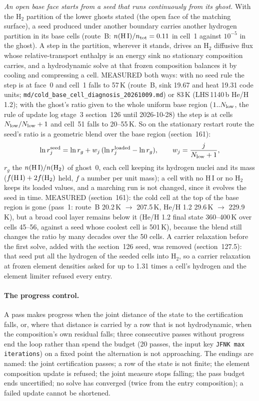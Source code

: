 \emph{An open base face starts from a seed that runs continuously from its
ghost.}  With the H$_2$ partition of the lower ghosts stated (the open face of
the matching surface), a seed produced under another boundary carries another
hydrogen partition in its base cells (route~B: $n({\rm H\,I})/n_{\rm tot} =
0.11$ in cell~1 against $10^{-5}$ in the ghost).  A step in the partition,
wherever it stands, drives an H$_2$ diffusive flux whose relative-transport
enthalpy is an energy sink no stationary composition carries, and a
hydrodynamic solve at that frozen composition balances it by cooling and
compressing a cell.  MEASURED both ways: with no seed rule the step is at
face~0 and cell~1 falls to 57\,K (route~B, sink 19.67 and heat 19.31 code
units; \texttt{md/cold\_base\_cell\_diagnosis\_20261009.md}) or 83\,K
(LHS\,1140\,b He/H 1.2); with the ghost's ratio given to the whole uniform base
region ($1..N_{\rm low}$, the rule of update log stage~3 section~126 until
2026-10-28) the step is at cells $N_{\rm low}/N_{\rm low}+1$ and cell~51 falls
to 20--55\,K.  So on the stationary restart route the seed's ratio is a
geometric blend over the base region (section~161):
\[
\ln r_j^{\rm seed} = \ln r_g + w_j\,(\ln r_j^{\rm loaded} - \ln r_g), \qquad w_j =
\frac{j}{N_{\rm low}+1},
\]
$r_g$ the $n({\rm H\,I})/n({\rm H}_2)$ of ghost~0, each cell keeping its
hydrogen nuclei and its mass ($f({\rm H\,I}) + 2f({\rm H}_2)$ held, $f$ a
number per unit mass); a cell with no H\,I or no H$_2$ keeps its loaded
values, and a marching run is not changed, since it evolves the seed in time.
MEASURED (section~161): the cold cell at the top of the base region is gone
(pass~1: route~B 20.2\,K $\to$ 207.5\,K, He/H 1.2 29.6\,K $\to$ 229.9\,K), but
a broad cool layer remains below it (He/H 1.2 final state 360--400\,K over
cells 45--56, against a seed whose coolest cell is 501\,K), because the blend
still changes the ratio by many decades over the 50 cells.  A carrier
relaxation before the first solve, added with the section~126 seed, was removed
(section~127.5): that seed put all the hydrogen of the seeded cells into
H$_2$, so a carrier relaxation at frozen element densities asked for up to 1.31
times a cell's hydrogen and the element limiter refused every entry.

\paragraph{The progress control.}
A pass makes progress when the joint distance of the state to the
certification falls, or, where that distance is carried by a row that is not
hydrodynamic, when the composition's own residual falls; three consecutive
passes without progress end the loop rather than spend the budget (20 passes,
the input key \texttt{JFNK max iterations}) on a fixed point the alternation is not
approaching.  The endings are named: the joint certification passes; a row of
the state is not finite; the element composition update is refused; the
joint measure stops falling; the pass budget ends uncertified; no solve has
converged (twice from the entry composition); a failed update cannot be
shortened.

